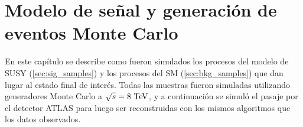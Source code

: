 \chapter{Modelo de señal y generación de eventos Monte Carlo}
\label{cap:simulaciones}

En este capítulo se describe como fueron simulados los procesos del modelo de
SUSY (\cref{sec:sig_samples}) y los procesos del SM (\cref{sec:bkg_samples}) que
dan lugar al estado final de interés. Todas las muestras fueron simuladas
utilizando generadores Monte Carlo a $\sqrt{s}=8\tev$, y a continuación se simuló
el pasaje por el detector ATLAS para luego ser reconstruidas con los mismos
algoritmos que los datos observados.








